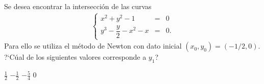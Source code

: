 \begin{pregunta}
\begin{cuerpo}
Se desea encontrar la intersecci\'on de las curvas
\begin{eqnarray*}
\left \{
\begin{array}{lcl}
x^2+y^2-1&=& 0\\
y^3-\dfrac{y}{2}-x^2-x&=&0.
\end{array}
\right.
\end{eqnarray*}
Para ello se utiliza el m\'etodo de Newton con dato inicial $(x_0,y_0)=(-1/2,0)$. ?`C\'ual de los siguientes valores corresponde a $y_1$? 
\end{cuerpo}
\begin{multicols}{4}
\begin{alternativas}
{$\frac{1}{2}$} %
{$-\frac{1}{2}$} 
{$-\frac{5}{4}$} 
{$0$}
\end{alternativas}
\end{multicols}
\justificacion{9cm}
\end{pregunta}